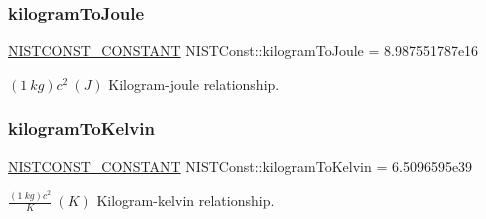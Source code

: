 \subsubsection{\texorpdfstring{kilogram\+To\+Joule}{kilogramToJoule}}
{\footnotesize\ttfamily \mbox{\hyperlink{group___n_i_s_t_const-_macros_ga2b0fc1d7452373f816175dd86ce26729}{N\+I\+S\+T\+C\+O\+N\+S\+T\+\_\+\+C\+O\+N\+S\+T\+A\+NT}} N\+I\+S\+T\+Const\+::kilogram\+To\+Joule = 8.\+987551787e16}

$(1\ kg)c^2 \ (J)$ Kilogram-\/joule relationship. \mbox{\label{group___n_i_s_t_const-_kilogram_ga9af74a62fa2240b7454d7340d13bb885}} 
\subsubsection{\texorpdfstring{kilogram\+To\+Kelvin}{kilogramToKelvin}}
{\footnotesize\ttfamily \mbox{\hyperlink{group___n_i_s_t_const-_macros_ga2b0fc1d7452373f816175dd86ce26729}{N\+I\+S\+T\+C\+O\+N\+S\+T\+\_\+\+C\+O\+N\+S\+T\+A\+NT}} N\+I\+S\+T\+Const\+::kilogram\+To\+Kelvin = 6.\+5096595e39}

$\frac{(1\ kg)c^2}{K} \ (K)$ Kilogram-\/kelvin relationship. 
